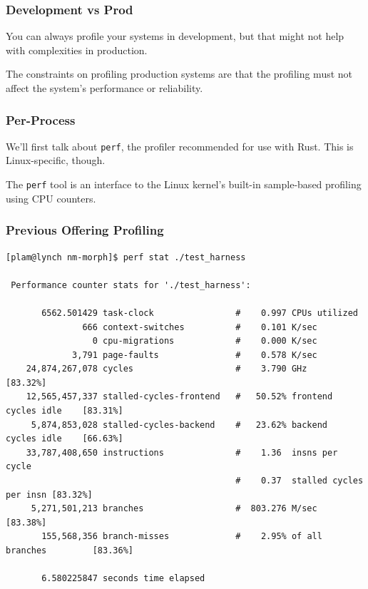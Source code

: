 \begin{frame}
\frametitle{Development vs Prod}

You can always profile your systems in development, but that might not
help with complexities in production. 

The constraints on profiling 
production systems are that the profiling must not affect the system's
performance or reliability.


\end{frame}


\begin{frame}
\frametitle{Per-Process}

 We'll first talk about {\tt perf}, the profiler 
recommended for use with Rust. This is Linux-specific, though.

The \texttt{perf} tool is an interface to the Linux kernel's built-in
sample-based profiling using CPU counters. 

\end{frame}


\begin{frame}[fragile]
\frametitle{Previous Offering Profiling}

\begin{lstlisting}[basicstyle=\scriptsize]
[plam@lynch nm-morph]$ perf stat ./test_harness

 Performance counter stats for './test_harness':

       6562.501429 task-clock                #    0.997 CPUs utilized          
               666 context-switches          #    0.101 K/sec                  
                 0 cpu-migrations            #    0.000 K/sec                  
             3,791 page-faults               #    0.578 K/sec                  
    24,874,267,078 cycles                    #    3.790 GHz                     [83.32%]
    12,565,457,337 stalled-cycles-frontend   #   50.52% frontend cycles idle    [83.31%]
     5,874,853,028 stalled-cycles-backend    #   23.62% backend  cycles idle    [66.63%]
    33,787,408,650 instructions              #    1.36  insns per cycle        
                                             #    0.37  stalled cycles per insn [83.32%]
     5,271,501,213 branches                  #  803.276 M/sec                   [83.38%]
       155,568,356 branch-misses             #    2.95% of all branches         [83.36%]

       6.580225847 seconds time elapsed
\end{lstlisting} %

\end{frame}


